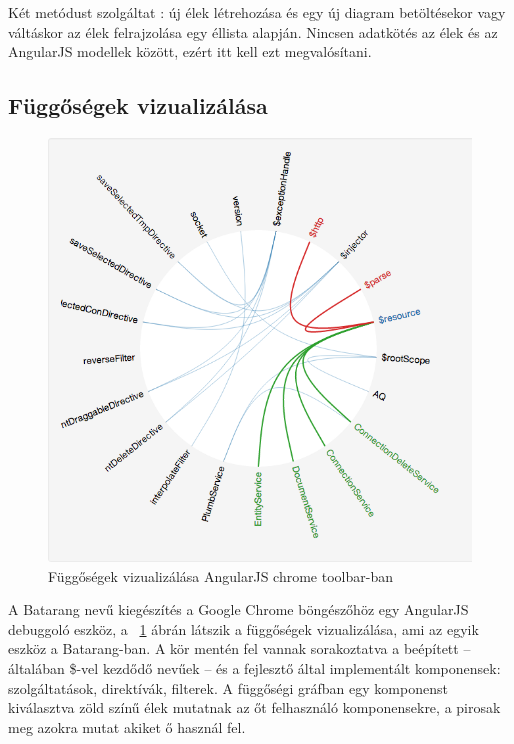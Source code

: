 Két metódust szolgáltat : új élek létrehozása és egy új diagram betöltésekor  vagy váltáskor az élek felrajzolása egy éllista alapján.
Nincsen adatkötés az élek és az AngularJS modellek között, ezért itt kell ezt megvalósítani.

\subsection{Függőségek vizualizálása}

\begin{figure}[!ht]
\centering
\includegraphics[width=15cm,keepaspectratio]{figures/dependencies.png}
\caption{Függőségek vizualizálása AngularJS chrome toolbar-ban}
\label{fig:angulardependencies}
\end{figure}


\cite{https://github.com/angular/angularjs-batarang/blob/master/README.md}
A Batarang nevű kiegészítés a Google Chrome böngészőhöz egy AngularJS debuggoló eszköz, a ~\ref{fig:angulardependencies} ábrán látszik a függőségek vizualizálása, ami az egyik eszköz a Batarang-ban. A kör mentén fel vannak sorakoztatva a beépített -- általában \$-vel kezdődő nevűek -- és a fejlesztő által implementált komponensek: szolgáltatások, direktívák, filterek. A függőségi gráfban egy komponenst kiválasztva zöld színű élek mutatnak az őt felhasználó komponensekre, a pirosak meg azokra mutat akiket ő használ fel.




